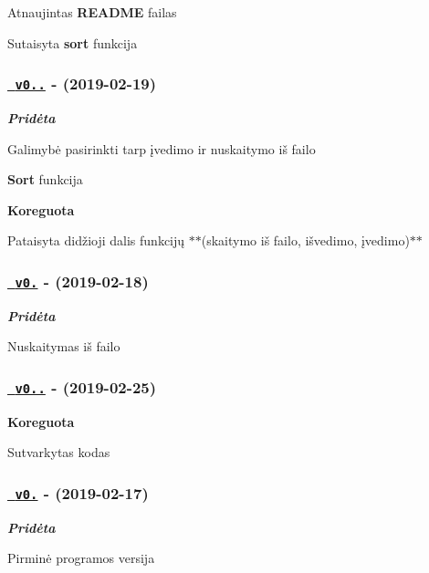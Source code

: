 \begin{DoxyItemize}
\item Atnaujintas {\bfseries{R\+E\+A\+D\+ME}} failas
\item Sutaisyta {\bfseries{sort}} funkcija
\end{DoxyItemize}

\subsubsection*{\href{https://github.com/ToNyHasK/VUObjektinisNO2/releases/tag/v0.2.1}{\texttt{ v0..}} -\/ (2019-\/02-\/19)}

{\itshape {\bfseries{Pridėta}}}


\begin{DoxyItemize}
\item Galimybė pasirinkti tarp įvedimo ir nuskaitymo iš failo
\item {\bfseries{Sort}} funkcija
\end{DoxyItemize}

{\bfseries{Koreguota}}


\begin{DoxyItemize}
\item Pataisyta didžioji dalis funkcijų $\ast$$\ast$(skaitymo iš failo, išvedimo, įvedimo)$\ast$$\ast$
\end{DoxyItemize}

\subsubsection*{\href{https://github.com/ToNyHasK/VUObjektinisNO2/releases/tag/v0.2}{\texttt{ v0.}} -\/ (2019-\/02-\/18)}

{\itshape {\bfseries{Pridėta}}}


\begin{DoxyItemize}
\item Nuskaitymas iš failo
\end{DoxyItemize}

\subsubsection*{\href{https://github.com/ToNyHasK/VUObjektinisNO2/releases/tag/v0.1.1}{\texttt{ v0..}} -\/ (2019-\/02-\/25)}

{\bfseries{Koreguota}}


\begin{DoxyItemize}
\item Sutvarkytas kodas
\end{DoxyItemize}

\subsubsection*{\href{https://github.com/ToNyHasK/VUObjektinisNO2/releases/tag/v0.1}{\texttt{ v0.}} -\/ (2019-\/02-\/17)}

{\itshape {\bfseries{Pridėta}}}


\begin{DoxyItemize}
\item Pirminė programos versija 
\end{DoxyItemize}